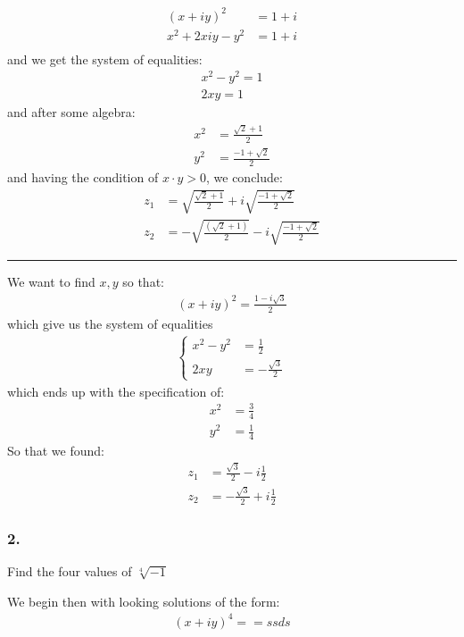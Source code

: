 \begin{align*}
(x + iy)^2 &= 1 + i \\
x^2 + 2xiy - y^2 &= 1 + i\\
\end{align*}
and we get the system of equalities:
\begin{align*}
x^2 - y^2 = 1 \\ 
2xy = 1
\end{align*}
and after some algebra:
\begin{align*}
x^2 &= \frac{\sqrt{2} + 1}{2} \\
y^2 &= \frac{-1 + \sqrt{2} }{2}
\end{align*}
and having the condition of $x \cdot y > 0 $, we conclude:
\begin{align*}
z_1 &= \sqrt{\frac{\sqrt{2} + 1}{2}} + i \sqrt{\frac{-1 + \sqrt{2}}{2} }\\
z_2 &= -\sqrt{\frac{(\sqrt{2} + 1)}{2}} - i \sqrt{ \frac{-1 + \sqrt{2} }{2} }
\end{align*}
\rule{\textwidth}{1pt}
We want to find $x,y$ so that:
\begin{align*}
(x + iy)^2 = \frac{1 - i \sqrt{3}}{2}
\end{align*}
which give us the system of equalities
\begin{align*}
\begin{cases}
x^2 - y^2 &= \frac{1}{2} \\
2xy &= -\frac{\sqrt{3}}{2} 
\end{cases}
\end{align*}
which ends up with the specification of: 
\begin{align*}
	x^2 &= \frac{3}{4} \\
	y^2 &= \frac{1}{4}
\end{align*}
So that we found:
\begin{align*}
z_1 &= \frac{\sqrt{3}}{2} - i\frac{1}{2} \\
z_2 &= -\frac{\sqrt{3}}{2} + i \frac{1}{2}
\end{align*}
\subsubsection{2.} Find the four values of $ \sqrt[4]{-1} $

We begin then with looking solutions of the form:
\begin{align*}
(x + iy)^4	==ssds
\end{align*} 
